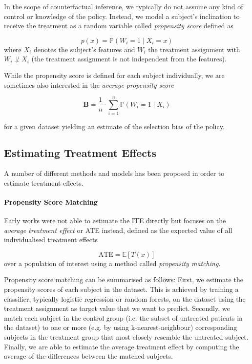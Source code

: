 In the scope of counterfactual inference, we typically do not assume any kind of control or knowledge of the policy. Instead, we model a subject's inclination to receive the treatment as a random variable called \emph{propensity score} defined as 

\begin{equation}
p(x) = \mathbb{P}(W_i = 1 \mid X_i = x)
\end{equation}
where $X_i$ denotes the subject's features and $W_i$ the treatment assignment with $W_i \not \perp X_i$ (the treatment assignment is not independent from the features). 

While the propensity score is defined for each subject individually, we are sometimes also interested in the \emph{average propensity score} 

\begin{equation}
	\mathbf{B} = \frac{1}{n} \cdot \sum \limits_{{i=1}}^{n}  \mathbb{P}(W_i = 1 \mid X_i)
\end{equation}

for a given dataset yielding an estimate of the selection bias of the policy. 

\subsection{Estimating Treatment Effects} \label{sec:status-quo}
A number of different methods and models has been proposed in order to estimate treatment effects. 

\paragraph{Propensity Score Matching} Early works were not able to estimate the ITE directly but focuses on the \emph{average treatment effect} or ATE instead, defined as the expected value of all individualised treatment effects

\begin{equation}
\text{ATE} = \mathbb{E}[T(x)]
\end{equation}
over a population of interest using a method called \emph{propensity matching}. %

Propensity score matching  can be summarised as follows: First, we estimate the propensity scores of each subject in the dataset. This is achieved by training a classifier, typically logistic regression or random forests, on the dataset using the treatment assignment as target value that we want to predict. Secondly, we match each subject in the control group (i.e. the subset of untreated patients in the dataset) to one or more (e.g. by using k-nearest-neighbour) corresponding subjects in the treatment group that most closely resemble the untreated subject. Finally, we are able to estimate  the average treatment effect by computing the average of the differences between the matched subjects. 

